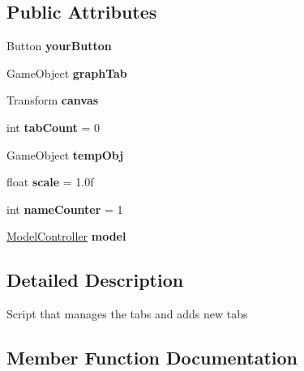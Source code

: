 \subsection*{Public Attributes}
\begin{DoxyCompactItemize}
\item 
\mbox{\label{class_tab_manager_a4da840c069f5dbdff9e99072b892853a}} 
Button {\bfseries your\+Button}
\item 
\mbox{\label{class_tab_manager_ac948c833bf1af52a2b6fe0329633b5de}} 
Game\+Object {\bfseries graph\+Tab}
\item 
\mbox{\label{class_tab_manager_ac5766310834b7c9266c4f8ebdd3e094e}} 
Transform {\bfseries canvas}
\item 
\mbox{\label{class_tab_manager_a4e2bfa11e6d027771976694f5d7031a7}} 
int {\bfseries tab\+Count} = 0
\item 
\mbox{\label{class_tab_manager_a5ef5fb0116c9331f3df7e4e2b7dc4099}} 
Game\+Object {\bfseries temp\+Obj}
\item 
\mbox{\label{class_tab_manager_a9b81c8d17fb6fba80bbbbc9fe7d66efc}} 
float {\bfseries scale} = 1.\+0f
\item 
\mbox{\label{class_tab_manager_aa946d34ac37a73032a4f8b9eb7d5eddb}} 
int {\bfseries name\+Counter} = 1
\item 
\mbox{\label{class_tab_manager_a856215722f62956293ae49169e8511e2}} 
\hyperlink{class_model_controller}{Model\+Controller} {\bfseries model}
\end{DoxyCompactItemize}


\subsection{Detailed Description}
Script that manages the tabs and adds new tabs 



\subsection{Member Function Documentation}
\mbox{\label{class_tab_manager_addabe80f37af16c101517e0a4c63fdef}} 
